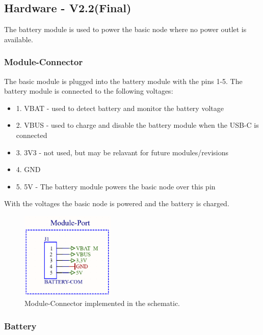 \subsection{Hardware - V2.2(Final)}

    The battery module is used to power the basic node where no power outlet is available.

    \subsubsection{Module-Connector}
        The basic module is plugged into the battery module with the pins 1-5. 
        The battery module is connected to the following voltages:

        \begin{itemize}
            \item 1. VBAT - used to detect battery and monitor the battery voltage
            \item 2. VBUS - used to charge and disable the battery module when the USB-C 
            is connected
            \item 3. 3V3 - not used, but may be relavant for future modules/revisions
            \item 4. GND
            \item 5. 5V - The battery module powers the basic node over this pin
        \end{itemize}
        
        With the voltages the basic node is powered and the battery is charged.

        \begin{figure}[H]
            \centering
            \includegraphics[width=0.4\textwidth]{assets/HW/BatteryV2.2-Port.png}
            \caption{Module-Connector implemented in the schematic.}
        \end{figure}

    

    \subsubsection{Battery}

